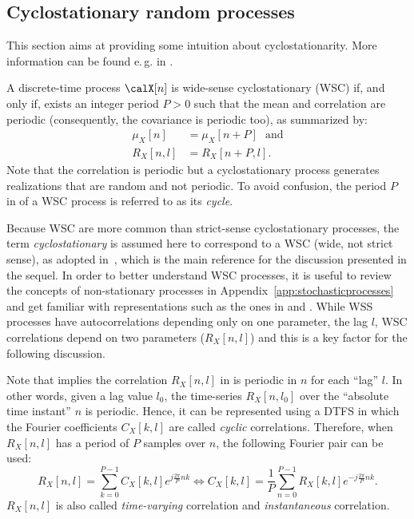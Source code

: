 \subsection{Cyclostationary random processes}
\label{sec:cyclostationarity}
This section aims at providing some intuition about cyclostationarity. More information
can be found e.\,g. in \cite{Giannakis99,Antoni07,Gardner91}.

A discrete-time process $\calX[n]$ is wide-sense cyclostationary (WSC) if, and only if, exists an integer period $P > 0$ such that the mean and correlation are periodic (consequently, the covariance is periodic too), as summarized by:
\begin{align}
\mu_X[n] &= \mu_X[n+P]  \textrm{~~and}\nonumber \\
R_{X}[n,l] &= R_{X}[n+P,l].
\label{eq:cycloConditions}
\end{align}
Note that the correlation is periodic but a cyclostationary process generates realizations
that are random and not periodic.
To avoid confusion, the period $P$ in  of a WSC process is referred to as its \emph{cycle}.

Because WSC are more common than strict-sense cyclostationary processes, the term \emph{cyclostationary}
is assumed here to correspond to a WSC (wide, not strict sense), as adopted in~\cite{Giannakis99}, which is the main reference for the discussion presented in the sequel.
In order to better understand WSC processes, it is useful to review the concepts of non-stationary processes in Appendix~\ref{app:stochasticprocesses} and get familiar with representations such
as the ones in  and . While WSS processes have autocorrelations depending only on one parameter, the lag $l$, WSC correlations depend on two parameters ($R_{X}[n,l]$) and this is a key factor for the following discussion.

Note that  implies the correlation $R_{X}[n,l]$ in  is periodic in $n$ for each ``lag'' $l$. In other words, given a lag value $l_0$, 
the time-series $R_{X}[n,l_0]$ over the ``absolute time instant'' $n$ is periodic.
Hence, it can be represented using a DTFS in which the Fourier coefficients $C_X[k,l]$ are 
called \emph{cyclic} correlations. Therefore, when $R_X[n,l]$ has a period of $P$ samples over $n$, the following Fourier pair can be used:
\begin{equation}
R_{X}[n,l] = \sum_{k=0}^{P-1} C_X[k,l] e^{j \frac{2\pi}{P}nk} \Leftrightarrow 
C_{X}[k,l] = \frac{1}{P}\sum_{n=0}^{P-1} R_X[k,l] e^{-j \frac{2\pi}{P}nk}.
\label{eq:cycloDTFS}
\end{equation}
$R_{X}[n,l]$ is also called \emph{time-varying} correlation and \emph{instantaneous} correlation.

